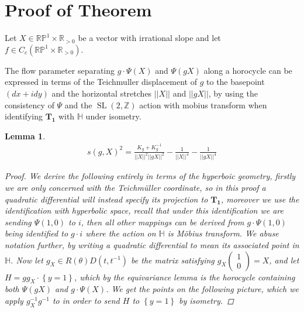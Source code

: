 \documentclass{article}
\newtheorem{lemma}{Lemma}
\newcommand{\set}[1]{\left\{#1\right\}}
\newcommand{\norm}[1]{\lvert\lvert#1\rvert\rvert}
\newcommand{\slz}{\operatorname{SL}(2,\mathbb{Z})}
\begin{document}
        \section{Proof of Theorem}

        Let \(X \in \mathbb{RP}^1 \times \mathbb{R}_{>0}\) be a vector with irrational slope and let \(f \in C_c(\mathbb{RP}^1 \times \mathbb{R}_{>0})\).

        The flow parameter separating \(g\cdot\Psi(X)\) and \(\Psi(gX)\) along a horocycle can be expressed in terms of the Teichmuller displacement of \(g\) to the basepoint \((dx + idy)\) and the horizontal stretches \(\norm{X}\) and \(\norm{gX}\), by using the consistency of \(\Psi\) and the \(\slz\) action with mobius transform when identifying \(\mathbf{T_1}\) with \(\mathbb{H}\) under isometry.
        \begin{lemma}
            \begin{align*}
                s(g,X)^2 = \frac{K_g + K_{g}^{-1}}{\norm{X}^2\norm{g X}^2} - \frac{1}{\norm{X}^4} - \frac{1}{\norm{g X}^4}
            \end{align*}
            \begin{proof}
                We derive the following entirely in terms of the hyperboic geometry, firstly we are only concerned with the Teichm\"uller coordinate, so in this proof a quadratic differential will instead specify its projection to \(\mathbf{T_1}\), moreover we use the identification with hyperbolic space, recall that under this identification we are sending \(\Psi(1,0)\) to \(i\), then all other mappings can be derived from \(g\cdot \Psi(1,0)\) being identified to \(g\cdot i\) where the action on \(\mathbb{H}\) is M\"obius transform. We abuse notation further, by writing a quadratic differential to mean its associated point in \(\mathbb{H}\). Now let \(g_X \in R(\theta)D(t,t^{-1})\) be the matrix satisfying \(g_X \begin{pmatrix} 1 \\ 0 \end{pmatrix} = X\), and let \(H = gg_X\cdot \set{y = 1}\), which by the equivariance lemma is the horocycle containing both \(\Psi(gX)\) and \(g\cdot \Psi(X)\). We get the points on the following picture, which we apply \(g_X^{-1}g^{-1}\) to in order to send \(H\) to \(\set{y = 1}\) by isometry.


\end{proof}
\end{lemma}
\end{document}
